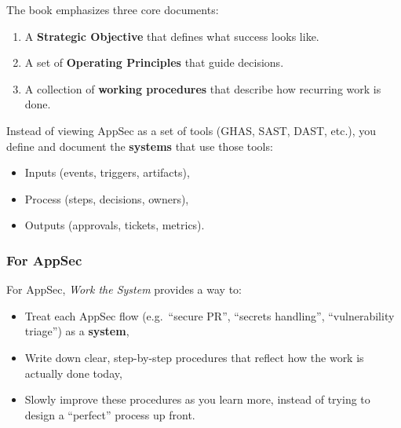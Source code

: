 \documentclass[11pt]{article}
\begin{document}
The book emphasizes three core documents:

\begin{enumerate}
  \item A \textbf{Strategic Objective} that defines what success looks like.
  \item A set of \textbf{Operating Principles} that guide decisions.
  \item A collection of \textbf{working procedures} that describe
        how recurring work is done.
\end{enumerate}

Instead of viewing AppSec as a set of tools (GHAS, SAST, DAST, etc.),
you define and document the \textbf{systems} that use those tools:

\begin{itemize}
  \item Inputs (events, triggers, artifacts),
  \item Process (steps, decisions, owners),
  \item Outputs (approvals, tickets, metrics).
\end{itemize}

\subsubsection*{For AppSec}

For AppSec, \emph{Work the System} provides a way to:
\begin{itemize}
  \item Treat each AppSec flow (e.g.\ ``secure PR'', ``secrets handling'',
        ``vulnerability triage'') as a \textbf{system},
  \item Write down clear, step-by-step procedures that reflect how the work
        is actually done today,
  \item Slowly improve these procedures as you learn more, instead of trying
        to design a ``perfect'' process up front.
\end{itemize}
\end{document}
